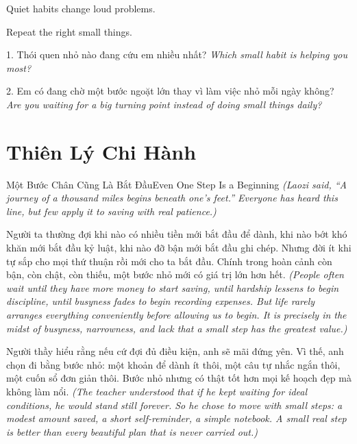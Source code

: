 \begin{ghinhoanh}
Quiet habits change loud problems.

Repeat the right small things.
\end{ghinhoanh}

\begin{tuhocnhanh}
1. Thói quen nhỏ nào đang cứu em nhiều nhất? \textit{Which small habit is helping you most?}

2. Em có đang chờ một bước ngoặt lớn thay vì làm việc nhỏ mỗi ngày không? \textit{Are you waiting for a big turning point instead of doing small things daily?}
\end{tuhocnhanh}
\ngancach

\section{Thiên Lý Chi Hành}
\begin{truyen}{Một Bước Chân Cũng Là Bắt Đầu}{Even One Step Is a Beginning}
\textit{(Laozi said, ``A journey of a thousand miles begins beneath one’s feet.'' Everyone has heard this line, but few apply it to saving with real patience.)}

Người ta thường đợi khi nào có nhiều tiền mới bắt đầu để dành, khi nào bớt khó khăn mới bắt đầu kỷ luật, khi nào đỡ bận mới bắt đầu ghi chép. Nhưng đời ít khi tự sắp cho mọi thứ thuận rồi mới cho ta bắt đầu. Chính trong hoàn cảnh còn bận, còn chật, còn thiếu, một bước nhỏ mới có giá trị lớn hơn hết.
\textit{(People often wait until they have more money to start saving, until hardship lessens to begin discipline, until busyness fades to begin recording expenses. But life rarely arranges everything conveniently before allowing us to begin. It is precisely in the midst of busyness, narrowness, and lack that a small step has the greatest value.)}

Người thầy hiểu rằng nếu cứ đợi đủ điều kiện, anh sẽ mãi đứng yên. Vì thế, anh chọn đi bằng bước nhỏ: một khoản để dành ít thôi, một câu tự nhắc ngắn thôi, một cuốn sổ đơn giản thôi. Bước nhỏ nhưng có thật tốt hơn mọi kế hoạch đẹp mà không làm nổi.
\textit{(The teacher understood that if he kept waiting for ideal conditions, he would stand still forever. So he chose to move with small steps: a modest amount saved, a short self-reminder, a simple notebook. A small real step is better than every beautiful plan that is never carried out.)}
\end{truyen}

